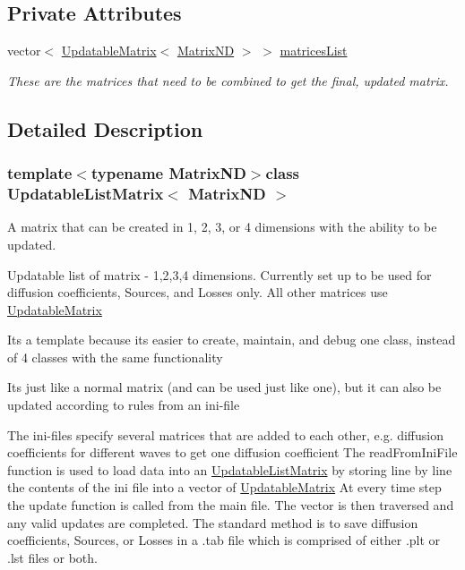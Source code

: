 \subsection*{Private Attributes}
\begin{DoxyCompactItemize}
\item 
\hypertarget{class_updatable_list_matrix_a04b21c7757c329838c6238ebec80327f}{}vector$<$ \hyperlink{class_updatable_matrix}{Updatable\+Matrix}$<$ \hyperlink{class_matrix_n_d}{Matrix\+N\+D} $>$ $>$ \hyperlink{class_updatable_list_matrix_a04b21c7757c329838c6238ebec80327f}{matrices\+List}\label{class_updatable_list_matrix_a04b21c7757c329838c6238ebec80327f}

\begin{DoxyCompactList}\small\item\em These are the matrices that need to be combined to get the final, updated matrix. \end{DoxyCompactList}\end{DoxyCompactItemize}


\subsection{Detailed Description}
\subsubsection*{template$<$typename Matrix\+N\+D$>$class Updatable\+List\+Matrix$<$ Matrix\+N\+D $>$}

A matrix that can be created in 1, 2, 3, or 4 dimensions with the ability to be updated. 

Updatable list of matrix -\/ 1,2,3,4 dimensions. Currently set up to be used for diffusion coefficients, Sources, and Losses only. All other matrices use \hyperlink{class_updatable_matrix}{Updatable\+Matrix}

It\textquotesingle{}s a template because it\textquotesingle{}s easier to create, maintain, and debug one class, instead of 4 classes with the same functionality

It\textquotesingle{}s just like a normal matrix (and can be used just like one), but it can also be updated according to rules from an ini-\/file

The ini-\/files specify several matrices that are added to each other, e.\+g. diffusion coefficients for different waves to get one diffusion coefficient The read\+From\+Ini\+File function is used to load data into an \hyperlink{class_updatable_list_matrix}{Updatable\+List\+Matrix} by storing line by line the contents of the ini file into a vector of \hyperlink{class_updatable_matrix}{Updatable\+Matrix} At every time step the update function is called from the main file. The vector is then traversed and any valid updates are completed. The standard method is to save diffusion coefficients, Sources, or Losses in a .tab file which is comprised of either .plt or .lst files or both. 

